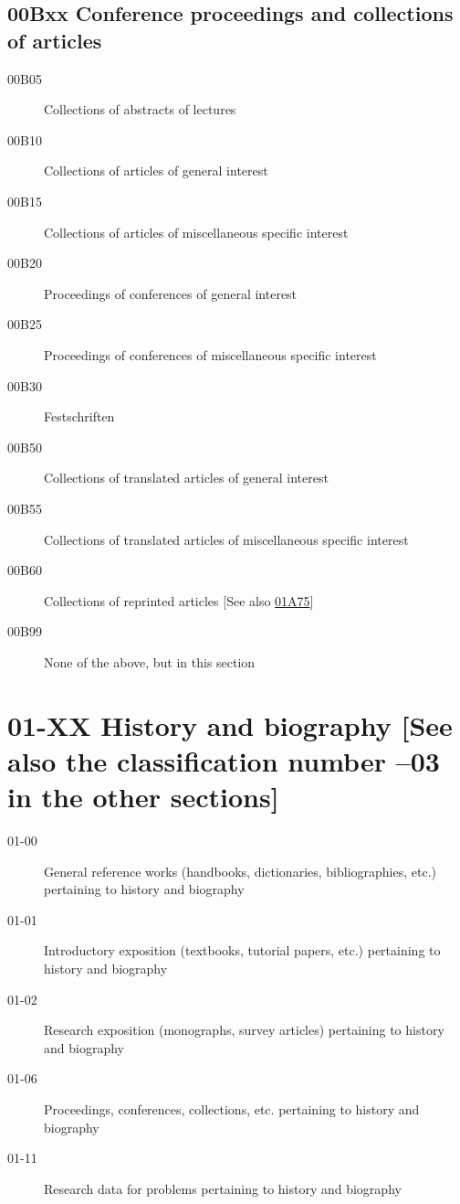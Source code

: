 \subsection*{00Bxx  Conference proceedings and collections of articles }\label{00Bxx}
\begin{description} 
\item [00B05]\label{00B05} Collections of abstracts of lectures
\item [00B10]\label{00B10} Collections of articles of general interest
\item [00B15]\label{00B15} Collections of articles of miscellaneous specific interest
\item [00B20]\label{00B20} Proceedings of conferences of general interest
\item [00B25]\label{00B25} Proceedings of conferences of miscellaneous specific interest
\item [00B30]\label{00B30} Festschriften
\item [00B50]\label{00B50} Collections of translated articles of general interest
\item [00B55]\label{00B55} Collections of translated articles of miscellaneous specific interest
\item [00B60]\label{00B60} Collections of reprinted articles [See also \hyperref[01A75]{01A75}]
\item [00B99]\label{00B99} None of the above, but in this section
\end{description}
\section*{01-XX History and biography [See also the  classification number --03 in the other sections] }\label{01-XX}
\begin{description}
\item [01-00]\label{01-00} General reference works (handbooks, dictionaries, bibliographies, etc.) pertaining to history and biography
\item [01-01]\label{01-01} Introductory exposition (textbooks, tutorial papers, etc.) pertaining to history and biography
\item [01-02]\label{01-02} Research exposition (monographs, survey articles) pertaining to history and biography
\item [01-06]\label{01-06} Proceedings, conferences, collections, etc. pertaining to history and biography
\item [01-11]\label{01-11} Research data for problems pertaining to history and biography  
\end{description}
